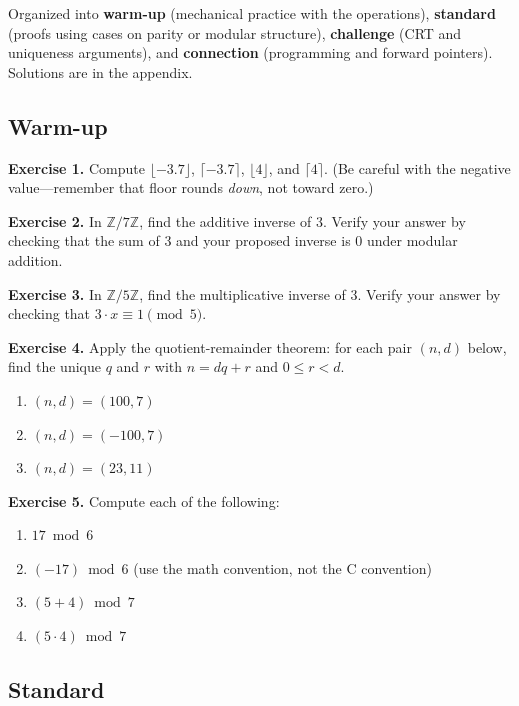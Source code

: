 \documentclass[11pt]{article}
\begin{document}
Organized into \textbf{warm-up} (mechanical practice with the operations), \textbf{standard} (proofs using cases on parity or modular structure), \textbf{challenge} (CRT and uniqueness arguments), and \textbf{connection} (programming and forward pointers). Solutions are in the appendix.

\subsection*{Warm-up}

\textbf{Exercise 1.}\label{ex:m6:1} Compute $\lfloor -3.7 \rfloor$, $\lceil -3.7 \rceil$, $\lfloor 4 \rfloor$, and $\lceil 4 \rceil$. (Be careful with the negative value---remember that floor rounds \emph{down}, not toward zero.)

\bigskip
\textbf{Exercise 2.}\label{ex:m6:2} In $\mathbb{Z}/7\mathbb{Z}$, find the additive inverse of $3$. Verify your answer by checking that the sum of $3$ and your proposed inverse is $0$ under modular addition.

\bigskip
\textbf{Exercise 3.}\label{ex:m6:3} In $\mathbb{Z}/5\mathbb{Z}$, find the multiplicative inverse of $3$. Verify your answer by checking that $3 \cdot x \equiv 1 \pmod 5$.

\bigskip
\textbf{Exercise 4.}\label{ex:m6:4} Apply the quotient-remainder theorem: for each pair $(n, d)$ below, find the unique $q$ and $r$ with $n = dq + r$ and $0 \leq r < d$.
\begin{enumerate}[label=(\alph*)]
  \item $(n, d) = (100, 7)$
  \item $(n, d) = (-100, 7)$
  \item $(n, d) = (23, 11)$
\end{enumerate}

\bigskip
\textbf{Exercise 5.}\label{ex:m6:5} Compute each of the following:
\begin{enumerate}[label=(\alph*)]
  \item $17 \bmod 6$
  \item $(-17) \bmod 6$ (use the math convention, not the C convention)
  \item $(5 + 4) \bmod 7$
  \item $(5 \cdot 4) \bmod 7$
\end{enumerate}

\subsection*{Standard}
\end{document}

